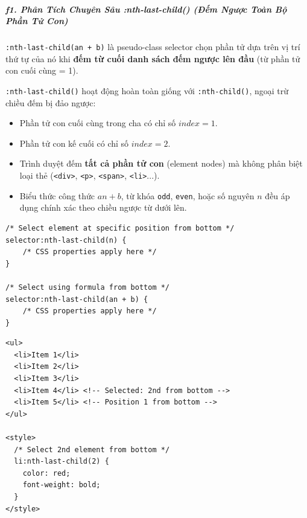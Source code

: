 \documentclass[11pt,oneside]{book}
\newcommand{\codeinline}[1]{\textcolor{accentOrange}{\texttt{#1}}}
\begin{document}
\subparagraph{f1. Phân Tích Chuyên Sâu :nth-last-child() (Đếm Ngược Toàn Bộ Phần Tử Con)}

\codeinline{:nth-last-child(an + b)} là pseudo-class selector chọn phần tử dựa trên vị trí thứ tự của nó khi \textbf{đếm từ cuối danh sách đếm ngược lên đầu} (từ phần tử con cuối cùng = 1).

\begin{conceptBox}
\codeinline{:nth-last-child()} hoạt động hoàn toàn giống với \codeinline{:nth-child()}, ngoại trừ chiều đếm bị đảo ngược:
\begin{itemize}[leftmargin=1.5em, itemsep=2pt, parsep=0pt]
    \item Phần tử con cuối cùng trong cha có chỉ số $index = 1$.
    \item Phần tử con kế cuối có chỉ số $index = 2$.
    \item Trình duyệt đếm \textbf{tất cả phần tử con} (element nodes) mà không phân biệt loại thẻ (\codeinline{<div>}, \codeinline{<p>}, \codeinline{<span>}, \codeinline{<li>}...).
    \item Biểu thức công thức $an + b$, từ khóa \codeinline{odd}, \codeinline{even}, hoặc số nguyên $n$ đều áp dụng chính xác theo chiều ngược từ dưới lên.
\end{itemize}
\end{conceptBox}

\begin{codeWindow}
\begin{lstlisting}[language=CSS3]
/* Select element at specific position from bottom */
selector:nth-last-child(n) {
    /* CSS properties apply here */
}

/* Select using formula from bottom */
selector:nth-last-child(an + b) {
    /* CSS properties apply here */
}
\end{lstlisting}
\end{codeWindow}

\begin{codeWindow}
\begin{lstlisting}[language=HTML5]
<ul>
  <li>Item 1</li>
  <li>Item 2</li>
  <li>Item 3</li>
  <li>Item 4</li> <!-- Selected: 2nd from bottom -->
  <li>Item 5</li> <!-- Position 1 from bottom -->
</ul>

<style>
  /* Select 2nd element from bottom */
  li:nth-last-child(2) {
    color: red;
    font-weight: bold;
  }
</style>
\end{lstlisting}
\end{codeWindow}
\end{document}
